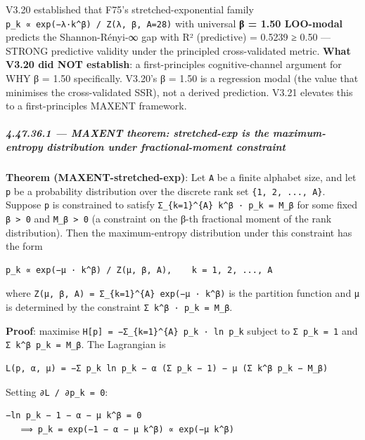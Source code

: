 \documentclass[
]{article}
\begin{document}
V3.20 established that F75's stretched-exponential family
\texttt{p\_k\ ∝\ exp(−λ·k\^{}β)\ /\ Z(λ,\ β,\ A=28)} with universal
\textbf{β = 1.50 LOO-modal} predicts the Shannon-Rényi-∞ gap with R²
(predictive) = 0.5239 ≥ 0.50 --- STRONG predictive validity under the
principled cross-validated metric. \textbf{What V3.20 did NOT
establish}: a first-principles cognitive-channel argument for WHY β =
1.50 specifically. V3.20's β = 1.50 is a regression modal (the value
that minimises the cross-validated SSR), not a derived prediction. V3.21
elevates this to a first-principles MAXENT framework.

\subparagraph{4.47.36.1 --- MAXENT theorem: stretched-exp is the
maximum-entropy distribution under fractional-moment
constraint}\label{maxent-theorem-stretched-exp-is-the-maximum-entropy-distribution-under-fractional-moment-constraint}

\textbf{Theorem (MAXENT-stretched-exp)}: Let \texttt{A} be a finite
alphabet size, and let \texttt{p} be a probability distribution over the
discrete rank set \texttt{\{1,\ 2,\ ...,\ A\}}. Suppose \texttt{p} is
constrained to satisfy
\texttt{Σ\_\{k=1\}\^{}\{A\}\ k\^{}β\ ·\ p\_k\ =\ M\_β} for some fixed
\texttt{β\ \textgreater{}\ 0} and \texttt{M\_β\ \textgreater{}\ 0} (a
constraint on the β-th fractional moment of the rank distribution). Then
the maximum-entropy distribution under this constraint has the form

\begin{verbatim}
p_k ∝ exp(−μ · k^β) / Z(μ, β, A),    k = 1, 2, ..., A
\end{verbatim}

where \texttt{Z(μ,\ β,\ A)\ =\ Σ\_\{k=1\}\^{}\{A\}\ exp(−μ\ ·\ k\^{}β)}
is the partition function and \texttt{μ} is determined by the constraint
\texttt{Σ\ k\^{}β\ ·\ p\_k\ =\ M\_β}.

\textbf{Proof}: maximise
\texttt{H{[}p{]}\ =\ −Σ\_\{k=1\}\^{}\{A\}\ p\_k\ ·\ ln\ p\_k} subject to
\texttt{Σ\ p\_k\ =\ 1} and \texttt{Σ\ k\^{}β\ p\_k\ =\ M\_β}. The
Lagrangian is

\begin{verbatim}
L(p, α, μ) = −Σ p_k ln p_k − α (Σ p_k − 1) − μ (Σ k^β p_k − M_β)
\end{verbatim}

Setting \texttt{∂L\ /\ ∂p\_k\ =\ 0}:

\begin{verbatim}
−ln p_k − 1 − α − μ k^β = 0
   ⟹ p_k = exp(−1 − α − μ k^β) ∝ exp(−μ k^β)
\end{verbatim}
\end{document}
